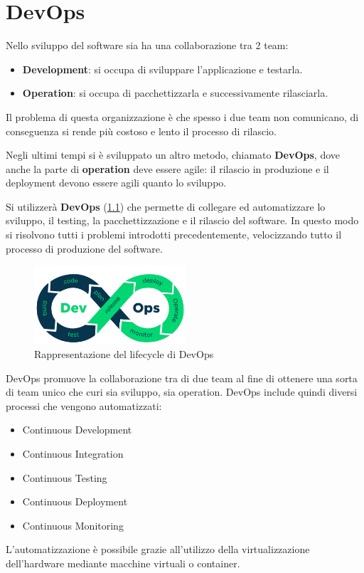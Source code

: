 \chapter{DevOps}
Nello sviluppo del software sia ha una collaborazione tra 2 team:
\begin{itemize}
      \item \textbf{Development}: si occupa di sviluppare l'applicazione e
            testarla.
      \item \textbf{Operation}: si occupa di pacchettizzarla e successivamente
            rilasciarla.
\end{itemize}
Il problema di questa organizzazione è che spesso i due team non comunicano, di
conseguenza si rende più costoso e lento il processo di rilascio.

Negli ultimi tempi si è sviluppato un altro metodo, chiamato \textbf{DevOps},
dove anche la parte di \textbf{operation} deve essere agile: il rilascio in
produzione e il deployment devono essere agili quanto lo sviluppo.

Si utilizzerà \textbf{DevOps} (\ref{fig:devops}) che permette di collegare ed
automatizzare lo sviluppo, il testing, la pacchettizzazione e il rilascio del
software. In questo modo si risolvono tutti i problemi introdotti precedentemente,
velocizzando tutto il processo di produzione del software.
\begin{figure}[!ht]
      \centering
      \includegraphics[width=0.5\textwidth]{img/devops/devops.png}
      \caption{Rappresentazione del lifecycle di DevOps}
      \label{fig:devops}
\end{figure}
DevOps promuove la collaborazione tra di due team al fine di ottenere una sorta
di team unico che curi sia sviluppo, sia operation. DevOps include quindi diversi
processi che vengono automatizzati:
\begin{itemize}
      \item Continuous Development
      \item Continuous Integration
      \item Continuous Testing
      \item Continuous Deployment
      \item Continuous Monitoring
\end{itemize}
L'automatizzazione è possibile grazie all'utilizzo della virtualizzazione
dell'hardware mediante macchine virtuali o container.

